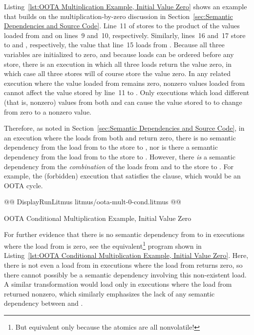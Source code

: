 \documentclass[10]{article}
\begin{document}
Listing~\ref{lst:OOTA Multiplication Example, Initial Value Zero}
shows an example that builds on the multiplication-by-zero
discussion in
Section~\ref{sec:Semantic Dependencies and Source Code}.
Line~11 of  stores to  the product of the values loaded from
 and  on lines~9 and~10, respectively.
Similarly, lines~16 and~17 store to  and , respectively,
the value that line~15 loads from .
Because all three variables are initialized to zero, and because loads
can be ordered before any store, there is an execution in which all
three loads return the value zero, in which case all three stores will
of course store the value zero.
In any related execution where the value loaded from  remains zero,
nonzero values loaded from  cannot affect the value stored by
line~11 to .
Only executions which load different (that is, nonzero) values from
both  and  can cause the value stored to  to change
from zero to a nonzero value.

Therefore, as noted in
Section~\ref{sec:Semantic Dependencies and Source Code},
in an execution where the loads from both  and  return zero,
there is no semantic dependency from the load from  to the
store to , nor is there a semantic dependency from the load
from  to the store to .
However, there \emph{is} a semantic dependency from the \emph{combination}
of the loads from  and  to the store to .
For example, the (forbidden) execution that satisfies the 
clause, which would be an OOTA cycle.

\begin{listing}[tbp]
@@ DisplayRunLitmus litmus/oota-mult-0-cond.litmus @@
\caption{OOTA Conditional Multiplication Example, Initial Value Zero}
\label{lst:OOTA Conditional Multiplication Example, Initial Value Zero}
\end{listing}

For further evidence that there is no semantic dependency from 
to  in executions where the load from  is zero, see the
equivalent\footnote{
	But equivalent only because the atomics are all nonvolatile!}
program shown in
Listing~\ref{lst:OOTA Conditional Multiplication Example, Initial Value Zero}.
Here, there is not even a load from  in executions where the
load from  returns zero, so there cannot possibly be a semantic
dependency involving this non-existent load.
A similar transformation would load  only in executions where the
load from  returned nonzero, which similarly emphasizes the lack
of any semantic dependency between  and .
\end{document}
